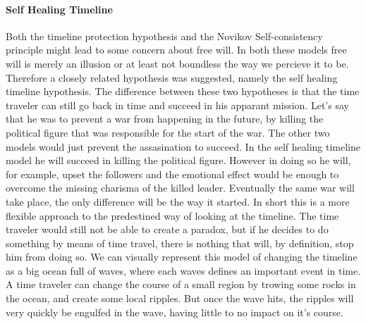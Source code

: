 \paragraph{Self Healing Timeline}
Both the timeline protection hypothesis and the Novikov Self-consistency principle might lead to some concern about free will. In both these models free will is merely an illusion or at least not boundless the way we percieve it to be. Therefore a closely related hypothesis was suggested, namely the self healing timeline hypothesis. The difference between these two hypotheses is that the time traveler can still go back in time and succeed in his apparant mission. Let's say that he was to prevent a war from happening in the future, by killing the political figure that was responsible for the start of the war. The other two models would just prevent the assasination to succeed. In the self healing timeline model he will succeed in killing the political figure. However in doing so he will, for example, upset the followers and the emotional effect would be enough to overcome the missing charisma of the killed leader. Eventually the same war will take place, the only difference will be the way it started. In short this is a more flexible approach to the predestined way of looking at the timeline. The time traveler would still not be able to create a paradox, but if he decides to do something by means of time travel, there is nothing that will, by definition, stop him from doing so. We can visually represent this model of changing the timeline as a big ocean full of waves, where each waves defines an important event in time. A time traveler can change the course of a small region by trowing some rocks in the ocean, and create some local ripples. But once the wave hits, the ripples will very quickly be engulfed in the wave, having little to no impact on it's course.

